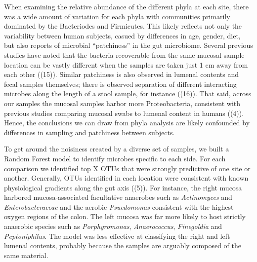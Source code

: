 \documentclass[11pt,]{article}
\begin{document}
When examining the relative abundance of the different phyla at each
site, there was a wide amount of variation for each phyla with
communities primarily dominated by the Bacteriodes and Firmicutes. This
likely reflects not only the variability between human subjects, casued
by differences in age, gender, diet, but also reports of microbial
``patchiness'' in the gut microbiome. Several previous studies have
noted that the bacteria recoverable from the same mucosal sample
location can be vastly different when the samples are taken just 1 cm
away from each other ((15)). Similar patchiness is also observed in
lumenal contents and fecal samples themselves; there is observed
separation of different interacting microbes along the length of a stool
sample, for instance ((16)). That said, across our samples the mucosal
samples harbor more Proteobacteria, consistent with previous studies
comparing mucosal swabs to lumenal content in humans ((4)). Hence, the
conclusions we can draw from phyla analysis are likely confounded by
differences in sampling and patchiness between subjects.

To get around the noisiness created by a diverse set of samples, we
built a Random Forest model to identify microbes specific to each side.
For each comparison we identified top X OTUs that were strongly
predictive of one site or another. Generally, OTUs identified in each
location were consistent with known physiological gradients along the
gut axis ((5)). For instance, the right mucosa harbored
mucosa-associated facultative anaerobes such as \emph{Actinomyces} and
\emph{Enterobacteraceae} and the aerobic \emph{Psuedomonas} consistent
with the highest oxygen regions of the colon. The left mucosa was far
more likely to host strictly anaerobic species such as
\emph{Porphyromonas}, \emph{Anaerococcus}, \emph{Finegoldia} and
\emph{Peptoniphilus}. The model was less effective at classifying the
right and left lumenal contents, probably because the samples are
arguably composed of the same material.
\end{document}
